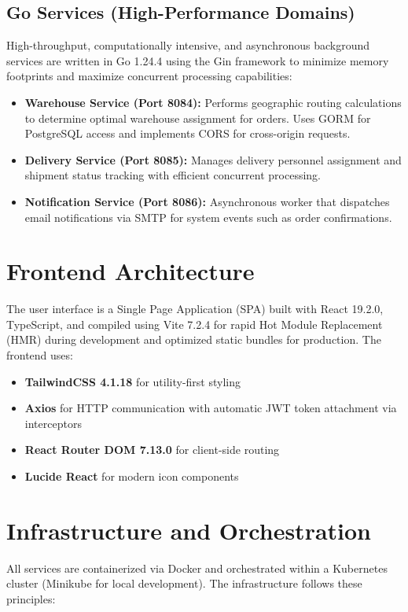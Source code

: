 \documentclass[12pt,a4paper]{report}
\begin{document}
\subsection{Go Services (High-Performance Domains)}
High-throughput, computationally intensive, and asynchronous background services are written in Go 1.24.4 using the Gin framework to minimize memory footprints and maximize concurrent processing capabilities:
\begin{itemize}
    \item \textbf{Warehouse Service (Port 8084):} Performs geographic routing calculations to determine optimal warehouse assignment for orders. Uses GORM for PostgreSQL access and implements CORS for cross-origin requests.
    \item \textbf{Delivery Service (Port 8085):} Manages delivery personnel assignment and shipment status tracking with efficient concurrent processing.
    \item \textbf{Notification Service (Port 8086):} Asynchronous worker that dispatches email notifications via SMTP for system events such as order confirmations.
\end{itemize}

\section{Frontend Architecture}
The user interface is a Single Page Application (SPA) built with React 19.2.0, TypeScript, and compiled using Vite 7.2.4 for rapid Hot Module Replacement (HMR) during development and optimized static bundles for production. The frontend uses:
\begin{itemize}
    \item \textbf{TailwindCSS 4.1.18} for utility-first styling
    \item \textbf{Axios} for HTTP communication with automatic JWT token attachment via interceptors
    \item \textbf{React Router DOM 7.13.0} for client-side routing
    \item \textbf{Lucide React} for modern icon components
\end{itemize}

\section{Infrastructure and Orchestration}
All services are containerized via Docker and orchestrated within a Kubernetes cluster (Minikube for local development). The infrastructure follows these principles:
\end{document}
